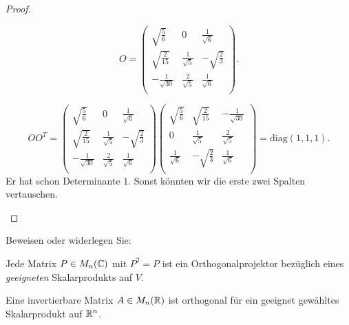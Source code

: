 \begin{proof}
\begin{parts}
	\[
	O=\left(
\begin{array}{ccc}
 \sqrt{\frac{5}{6}} & 0 & \frac{1}{\sqrt{6}} \\
 \sqrt{\frac{2}{15}} & \frac{1}{\sqrt{5}} & -\sqrt{\frac{2}{3}} \\
 -\frac{1}{\sqrt{30}} & \frac{2}{\sqrt{5}} & \frac{1}{\sqrt{6}} \\
\end{array}
\right) 
	.\] 
\item 
	\[
	O O^T=\left(
\begin{array}{ccc}
 \sqrt{\frac{5}{6}} & 0 & \frac{1}{\sqrt{6}} \\
 \sqrt{\frac{2}{15}} & \frac{1}{\sqrt{5}} & -\sqrt{\frac{2}{3}} \\
 -\frac{1}{\sqrt{30}} & \frac{2}{\sqrt{5}} & \frac{1}{\sqrt{6}} \\
\end{array}
\right) 
\left(
\begin{array}{ccc}
 \sqrt{\frac{5}{6}} & \sqrt{\frac{2}{15}} & -\frac{1}{\sqrt{30}} \\
 0 & \frac{1}{\sqrt{5}} & \frac{2}{\sqrt{5}} \\
 \frac{1}{\sqrt{6}} & -\sqrt{\frac{2}{3}} & \frac{1}{\sqrt{6}} \\
\end{array}
\right)=\text{diag}(1,1,1)
	.\] 
	Er hat schon Determinante $1$. Sonst könnten wir die erste zwei Spalten vertauschen.\qedhere
	\end{parts}
\end{proof}
\begin{Problem}
	Beweisen oder widerlegen Sie:
	\begin{parts}
	\item Jede Matrix $P\in M_n(\mathbb{C})$ mit $P^2=P$ ist ein Orthogonalprojektor bezüglich eines \emph{geeigneten} Skalarprodukts auf $V$.
	\item Eine invertierbare Matrix $A\in M_n(\mathbb{R})$ ist orthogonal f\"{u}r ein geeignet gewähltes Skalarprodukt auf $\mathbb{R}^n$.
	\end{parts}
\end{Problem}

